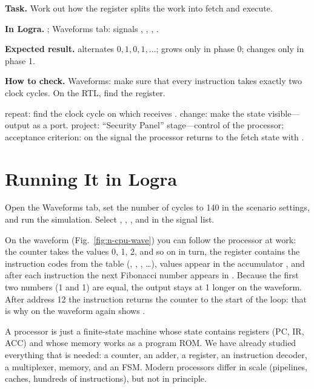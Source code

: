 \begin{diybox}
\textbf{Task.} Work out how the  register splits the work into fetch and execute.

\textbf{In Logra.} ; Waveforms tab: signals , , , .

\textbf{Expected result.}  alternates $0,1,0,1,\ldots$;  grows only in phase 0;  changes only in phase 1.

\textbf{How to check.} Waveforms: make sure that every instruction takes exactly two clock cycles. On the RTL, find the  register.

 repeat: find the clock cycle on which  receives .  change: make the  state visible---output  as a port.  project: ``Security Panel'' stage---control of the processor; acceptance criterion: on the  signal the processor returns to the fetch state with .
\end{diybox}

\section{Running It in Logra}

Open the Waveforms tab, set the number of cycles to 140 in the scenario
settings, and run the simulation. Select , , , and
 in the signal list.


On the waveform (Fig.~\ref{fig:n-cpu-wave}) you can follow the processor at work:
the counter  takes the values 0, 1, 2, and so on in turn, the register
 contains the instruction codes from the table (, ,
, \ldots), values appear in the accumulator , and after each
 instruction the next Fibonacci number appears in . Because
the first two numbers (1 and 1) are equal, the output stays at 1 longer on the
waveform. After address 12 the  instruction returns the counter to
the start of the loop: that is why  on the waveform again shows
.

\begin{ideabox}
A processor is just a finite-state machine whose state contains registers (PC,
IR, ACC) and whose memory works as a program ROM. We have already studied
everything that is needed: a counter, an adder, a register, an instruction
decoder, a multiplexer, memory, and an FSM. Modern processors differ in scale
(pipelines, caches, hundreds of instructions), but not in principle.
\end{ideabox}

